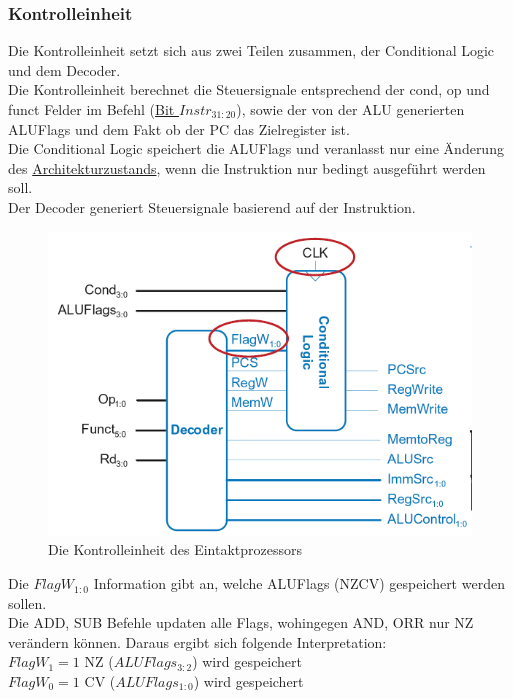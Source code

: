 \documentclass[a4paper,12pt,leqno]{article}
\begin{document}
\subsubsection{Kontrolleinheit}
Die Kontrolleinheit setzt sich aus zwei Teilen zusammen, der Conditional Logic und dem Decoder.\\
Die Kontrolleinheit berechnet die Steuersignale entsprechend der cond, op und funct Felder im Befehl (\hyperref[ldrBefehl]{Bit $Instr_{31:20}$}), sowie der von der ALU generierten ALUFlags und dem Fakt ob der PC das Zielregister ist.\\
Die Conditional Logic speichert die ALUFlags und veranlasst nur eine Änderung des \hyperref[Architekturzustand]{Architekturzustands}, wenn die Instruktion nur bedingt ausgeführt werden soll.\\
Der Decoder generiert Steuersignale basierend auf der Instruktion.\\

\begin{figure}[h!]
\centering
\includegraphics[scale=0.8]{Grafiken/Eintakt-Kontrolleinheit.png}
\caption{Die Kontrolleinheit des Eintaktprozessors}
\end{figure}

Die $FlagW_{1:0}$ Information gibt an, welche ALUFlags (NZCV) gespeichert werden sollen.\\
Die ADD, SUB Befehle updaten alle Flags, wohingegen AND, ORR nur NZ verändern können. Daraus ergibt sich folgende Interpretation:\\ $FlagW_1 = 1$ NZ ($ALUFlags_{3:2}$) wird gespeichert\\ $FlagW_0 = 1$ CV ($ALUFlags_{1:0}$) wird gespeichert
\end{document}
